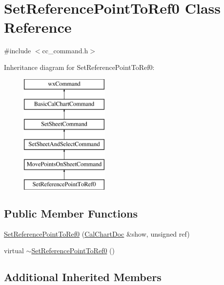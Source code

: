 \hypertarget{a00131}{\section{Set\-Reference\-Point\-To\-Ref0 Class Reference}
\label{a00131}
}


{\ttfamily \#include $<$cc\-\_\-command.\-h$>$}

Inheritance diagram for Set\-Reference\-Point\-To\-Ref0\-:\begin{figure}[H]
\begin{center}
\leavevmode
\includegraphics[height=6.000000cm]{a00131}
\end{center}
\end{figure}
\subsection*{Public Member Functions}
\begin{DoxyCompactItemize}
\item 
\hyperlink{a00131_ab411811614084a196cb39bab0f00bb12}{Set\-Reference\-Point\-To\-Ref0} (\hyperlink{a00020}{Cal\-Chart\-Doc} \&show, unsigned ref)
\item 
virtual \hyperlink{a00131_a0adafc4541f40c5a8da4affd47c2f37f}{$\sim$\-Set\-Reference\-Point\-To\-Ref0} ()
\end{DoxyCompactItemize}
\subsection*{Additional Inherited Members}


